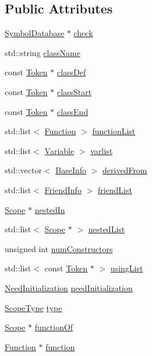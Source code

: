\subsection*{Public Attributes}
\begin{DoxyCompactItemize}
\item 
\hyperlink{class_symbol_database}{Symbol\-Database} $\ast$ \hyperlink{class_scope_aebd359f14708f074b4e009897c98d448}{check}
\item 
std\-::string \hyperlink{class_scope_ac10ee77e8bb514bbd256e8c4e471ad48}{class\-Name}
\item 
const \hyperlink{class_token}{Token} $\ast$ \hyperlink{class_scope_a98cdb9948344dd6df192d5225cac8530}{class\-Def}
\item 
const \hyperlink{class_token}{Token} $\ast$ \hyperlink{class_scope_af62c8893f9e0303a35b4416695103533}{class\-Start}
\item 
const \hyperlink{class_token}{Token} $\ast$ \hyperlink{class_scope_a5718de82469734086ea4910a9e97626b}{class\-End}
\item 
std\-::list$<$ \hyperlink{class_function}{Function} $>$ \hyperlink{class_scope_a04f5eece3b03314f760e59b7177aacbc}{function\-List}
\item 
std\-::list$<$ \hyperlink{class_variable}{Variable} $>$ \hyperlink{class_scope_a2254a4b1978050716ba23435b38f9af2}{varlist}
\item 
std\-::vector$<$ \hyperlink{struct_scope_1_1_base_info}{Base\-Info} $>$ \hyperlink{class_scope_a78a329cc4cc47ae0a896b8ca39aaf1d0}{derived\-From}
\item 
std\-::list$<$ \hyperlink{struct_scope_1_1_friend_info}{Friend\-Info} $>$ \hyperlink{class_scope_ac13625400b8f8419b44ad7f3f110d45a}{friend\-List}
\item 
\hyperlink{class_scope}{Scope} $\ast$ \hyperlink{class_scope_ab891d859d281e559cf0548fad12a91e6}{nested\-In}
\item 
std\-::list$<$ \hyperlink{class_scope}{Scope} $\ast$ $>$ \hyperlink{class_scope_aab597d177f8fc399c3f2714d86967845}{nested\-List}
\item 
unsigned int \hyperlink{class_scope_a61571028d8578220ad47a33d56c162ca}{num\-Constructors}
\item 
std\-::list$<$ const \hyperlink{class_token}{Token} $\ast$ $>$ \hyperlink{class_scope_a5f172bf299a4a5c7ccb431a4e1bffdb1}{using\-List}
\item 
\hyperlink{class_scope_a30cfddde990eaaa51f6e983dd6d4638e}{Need\-Initialization} \hyperlink{class_scope_a5eb13a7dc642f7b9adcd51ef17639443}{need\-Initialization}
\item 
\hyperlink{class_scope_a62d1e21d98f1a7c1203684eb155e2517}{Scope\-Type} \hyperlink{class_scope_a497c6539e9aca0fde06064ad578c3215}{type}
\item 
\hyperlink{class_scope}{Scope} $\ast$ \hyperlink{class_scope_afb99c30d1bb23560b6dfa89a6422bc87}{function\-Of}
\item 
\hyperlink{class_function}{Function} $\ast$ \hyperlink{class_scope_a566ff59e033eb9a39293b99f81976994}{function}
\end{DoxyCompactItemize}
